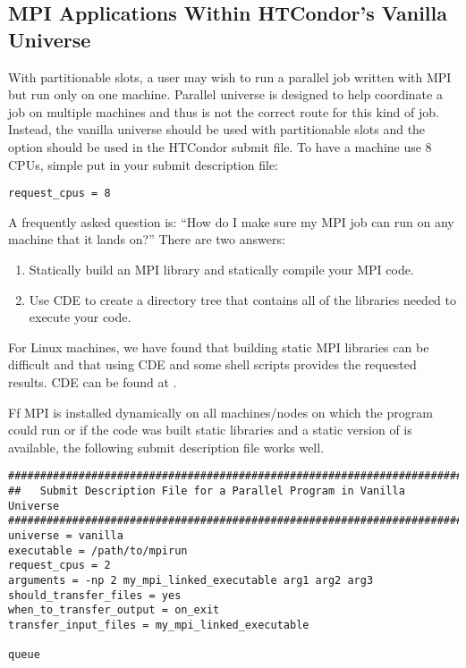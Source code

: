 
\subsection{\label{sec:parallel-mpi-submit-single}MPI Applications Within HTCondor's Vanilla Universe}

With partitionable slots, a user may wish to run a parallel job written with
MPI but run only on one machine. Parallel universe is designed to help 
coordinate a job on multiple machines and thus is not the correct route for
this kind of job. Instead, the vanilla universe should be used with partitionable
slots and the  option should be used in the HTCondor submit
file. To have a machine use 8 CPUs, simple put in your submit description file:

\begin{verbatim}
request_cpus = 8
\end{verbatim}

A frequently asked question is: ``How do I make sure my MPI job can run 
on any machine that it lands on?'' There are two answers:
\begin{enumerate}
\item Statically build an MPI library and statically compile your MPI code.
\item Use CDE to create a directory tree that contains all of the libraries 
needed to execute your code.
\end{enumerate}

For Linux machines, we have found that building static MPI libraries can be 
difficult and that 
using CDE and some shell scripts provides the requested results. CDE can be
found at .

Ff MPI is installed dynamically on all machines/nodes on which the program 
could run or if the code was built static libraries and a static version of 
 is available, the following
submit description file works well.
\begin{verbatim}
################################################################################
##   Submit Description File for a Parallel Program in Vanilla Universe
################################################################################
universe = vanilla
executable = /path/to/mpirun
request_cpus = 2
arguments = -np 2 my_mpi_linked_executable arg1 arg2 arg3
should_transfer_files = yes
when_to_transfer_output = on_exit
transfer_input_files = my_mpi_linked_executable

queue
\end{verbatim}

